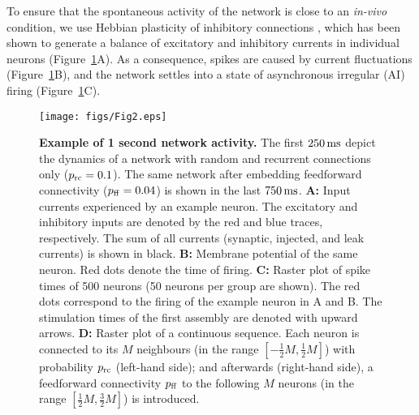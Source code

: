   To ensure that the spontaneous activity of the network is close to an
  \textit{in-vivo} condition, we use Hebbian plasticity of inhibitory
  connections \citep{Vogels2011}, which has been shown to generate a balance of
  excitatory and inhibitory currents in individual neurons (Figure~\ref{fig2}A).
  As a consequence, spikes are caused by current fluctuations
  (Figure~\ref{fig2}B), and the network settles into a state of asynchronous
  irregular (AI) firing (Figure~\ref{fig2}C).

  \begin{figure}[!h]
    \texttt{[image: figs/Fig2.eps]}
    \caption{{\bf Example of 1 second network activity.} The first $250 \,\rm
      ms$ depict the dynamics of a network with random and recurrent
      connections only ($p_{\rm rc} = 0.1$). The same network after embedding
      feedforward connectivity ($p_{\rm ff} = 0.04$) is shown in the last $750
      \,\rm ms$.
      \textbf{A:} Input currents experienced by an example neuron. The
      excitatory and inhibitory inputs are denoted by the red and blue traces,
      respectively. The sum of all currents (synaptic, injected, and leak
      currents) is shown in black.
      \textbf{B:} Membrane potential of the same neuron. Red dots denote
      the time of firing.
      \textbf{C:} Raster plot of spike times of 500 neurons (50 neurons per
      group are shown). The red dots correspond to the firing of the example
      neuron in A and B. The stimulation times of the first assembly are
      denoted with upward arrows.
      \textbf{D:} Raster plot of a continuous sequence. Each neuron is
      connected to its $M$ neighbours (in the range $[-\frac{1}{2}M, \frac{1}{2}M]$) with probability $p_{\rm rc}$ (left-hand
      side); and afterwards (right-hand side), a feedforward connectivity $p_{\rm ff}$ to the
      following $M$ neurons (in the range $[\frac{1}{2}M, \frac{3}{2}M]$) is
      introduced.
      }
    \label{fig2}
  \end{figure}

